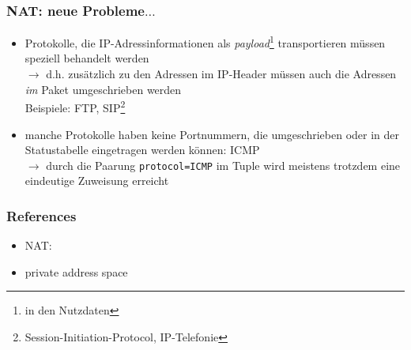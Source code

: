 \documentclass[ignorenonframetext]{beamer}
\begin{document}
\begin{frame}
\frametitle{NAT: neue Probleme$\ldots$}
\begin{itemize}
	\item{Protokolle, die IP-Adressinformationen als {\em payload}{}\footnote{in den Nutzdaten} transportieren m\"ussen speziell behandelt werden}\\
	$\rightarrow$ d.h. zus\"atzlich zu den Adressen im IP-Header m\"ussen auch die Adressen {\em im} Paket umgeschrieben werden\\
	Beispiele: FTP, SIP\footnote{Session-Initiation-Protocol, IP-Telefonie}
	\item{manche Protokolle haben keine Portnummern, die umgeschrieben oder in der Statustabelle eingetragen werden k\"onnen: ICMP}\\
	$\rightarrow$ durch die Paarung \texttt{protocol=ICMP} im Tuple wird meistens trotzdem eine eindeutige Zuweisung erreicht
\end{itemize}
\end{frame}






\begin{frame}
\frametitle{References}
\begin{itemize}
	\item{NAT: }
	\item{private address space }
\end{itemize}
\end{frame}
\end{document}

